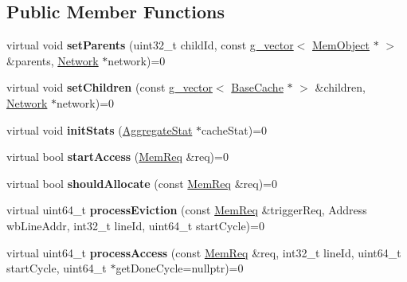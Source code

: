 \subsection*{Public Member Functions}
\begin{DoxyCompactItemize}
\item 
\hypertarget{classCC_a6b9d8a6acc32a2c279601078105ba94a}{virtual void {\bfseries set\-Parents} (uint32\-\_\-t child\-Id, const \hyperlink{classg__vector}{g\-\_\-vector}$<$ \hyperlink{classMemObject}{Mem\-Object} $\ast$ $>$ \&parents, \hyperlink{classNetwork}{Network} $\ast$network)=0}\label{classCC_a6b9d8a6acc32a2c279601078105ba94a}

\item 
\hypertarget{classCC_adcf73db25d1a7f19d875702cbd7d8da9}{virtual void {\bfseries set\-Children} (const \hyperlink{classg__vector}{g\-\_\-vector}$<$ \hyperlink{classBaseCache}{Base\-Cache} $\ast$ $>$ \&children, \hyperlink{classNetwork}{Network} $\ast$network)=0}\label{classCC_adcf73db25d1a7f19d875702cbd7d8da9}

\item 
\hypertarget{classCC_ad7b4e368967adaaab4fa63d5959ddbfe}{virtual void {\bfseries init\-Stats} (\hyperlink{classAggregateStat}{Aggregate\-Stat} $\ast$cache\-Stat)=0}\label{classCC_ad7b4e368967adaaab4fa63d5959ddbfe}

\item 
\hypertarget{classCC_a9637d8220e3588e4b7fd0460b1d2475a}{virtual bool {\bfseries start\-Access} (\hyperlink{structMemReq}{Mem\-Req} \&req)=0}\label{classCC_a9637d8220e3588e4b7fd0460b1d2475a}

\item 
\hypertarget{classCC_acca766f3f8379cf6c17c0fca4b8d3739}{virtual bool {\bfseries should\-Allocate} (const \hyperlink{structMemReq}{Mem\-Req} \&req)=0}\label{classCC_acca766f3f8379cf6c17c0fca4b8d3739}

\item 
\hypertarget{classCC_a336af65349d49287492ddcaa6197c6b0}{virtual uint64\-\_\-t {\bfseries process\-Eviction} (const \hyperlink{structMemReq}{Mem\-Req} \&trigger\-Req, Address wb\-Line\-Addr, int32\-\_\-t line\-Id, uint64\-\_\-t start\-Cycle)=0}\label{classCC_a336af65349d49287492ddcaa6197c6b0}

\item 
\hypertarget{classCC_a193b1f060826af44506030c2a78cebde}{virtual uint64\-\_\-t {\bfseries process\-Access} (const \hyperlink{structMemReq}{Mem\-Req} \&req, int32\-\_\-t line\-Id, uint64\-\_\-t start\-Cycle, uint64\-\_\-t $\ast$get\-Done\-Cycle=nullptr)=0}\label{classCC_a193b1f060826af44506030c2a78cebde}


\end{DoxyCompactItemize}
